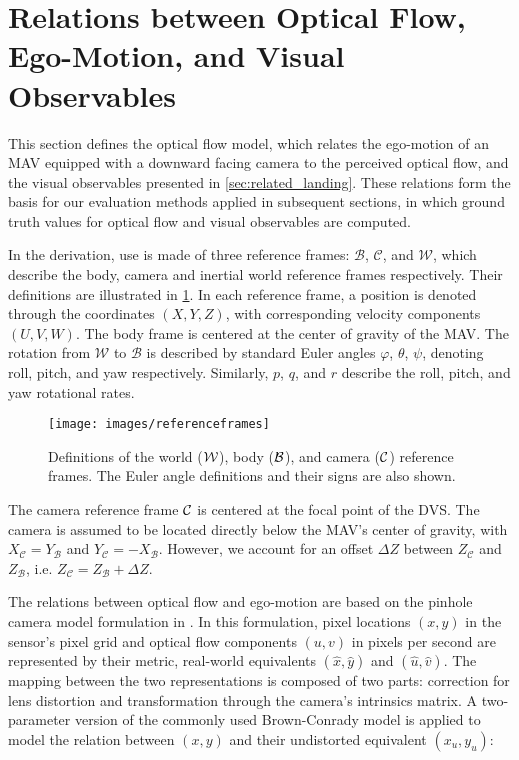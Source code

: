 \section{Relations between Optical Flow, Ego-Motion, and Visual Observables}
\label{sec:model}

This section defines the optical flow model, which relates the ego-motion of an MAV equipped with a downward facing camera to the perceived optical flow, and the visual observables presented in \cref{sec:related_landing}. These relations form the basis for our evaluation methods applied in subsequent sections, in which ground truth values for optical flow and visual observables are computed.

In the derivation, use is made of three reference frames: $\mathcal{B}$, $\mathcal{C}$, and $\mathcal{W}$, which describe the body, camera and inertial world reference frames respectively. Their definitions are illustrated in \cref{fig:referenceframes}. In each reference frame, a position is denoted through the coordinates $\left (X,Y,Z\right)$, with corresponding velocity components $\left (U,V,W\right)$. The body frame is centered at the center of gravity of the MAV. The rotation from $\mathcal{W}$ to $\mathcal{B}$ is described by standard Euler angles $\varphi$, $\theta$, $\psi$, denoting roll, pitch, and yaw respectively. Similarly, $p$, $q$, and $r$ describe the roll, pitch, and yaw rotational rates.

\begin{figure}[!t]
	\centering
	\texttt{[image: images/referenceframes]}
	\caption{Definitions of the world ($\cal W$), body ($\cal B$), and camera ($\cal C$) reference frames. The Euler angle definitions and their signs are also shown.}
	\label{fig:referenceframes}
\end{figure}

The camera reference frame $\cal C$ is centered at the focal point of the DVS. The camera is assumed to be located directly below the MAV's center of gravity, with $X_\mathcal{C} = Y_\mathcal{B}$ and $Y_\mathcal{C} = -X_\mathcal{B}$. However, we account for an offset $\Delta Z$ between $Z_\mathcal{C}$ and $Z_\mathcal{B}$, i.e. $Z_\mathcal{C} = Z_\mathcal{B}+\Delta Z$.

The relations between optical flow and ego-motion are based on the pinhole camera model formulation in \citet{Longuet-Higgins1980}. In this formulation, pixel locations $\left(x,y\right)$ in the sensor's pixel grid and optical flow components $\left(u,v\right)$ in pixels per second are represented by their metric, real-world equivalents $\left(\hat x, \hat y\right)$ and $\left(\hat u, \hat v\right)$. The mapping between the two representations is composed of two parts: correction for lens distortion and transformation through the camera's intrinsics matrix. A two-parameter version of the commonly used Brown-Conrady model \cite{Brown1966} is applied to model the relation between $\left(x,y\right)$ and their undistorted equivalent $\left(x_u,y_u\right)$: 

